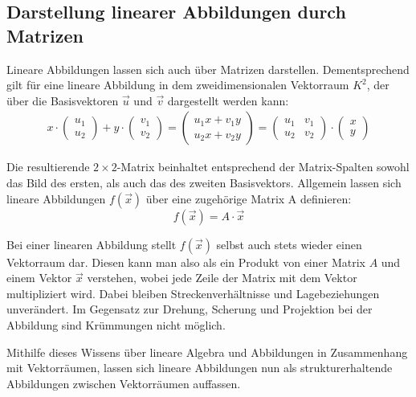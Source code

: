 \documentclass[]{dsadokumentation}
\begin{document}
\subsection{Darstellung linearer Abbildungen durch Matrizen}
Lineare Abbildungen lassen sich auch über Matrizen darstellen. Dementsprechend gilt für eine lineare Abbildung in dem zweidimensionalen Vektorraum $K^2$, der über die Basisvektoren $\vec{u}$ und $\vec{v}$ dargestellt werden kann:
\begin{equation}
  \begin{aligned}
    x \cdot \left(\begin{array}{c} u_1 \\ u_2 \end{array}\right) + y \cdot \left(\begin{array}{c} v_1 \\ v_2 \end{array}\right) = \left(\begin{array}{c} u_1 x + v_1 y \\ u_2 x + v_2 y \end{array}\right) = \left( \begin{array}{rr} u_1 & v_1 \\ u_2 & v_2 \end{array}\right) \cdot \left(\begin{array}{c} x \\ y \end{array}\right)
  \end{aligned}
\end{equation}

Die resultierende $2 \times 2$-Matrix beinhaltet entsprechend der Matrix-Spalten sowohl das Bild des ersten, als auch das des zweiten Basisvektors. Allgemein lassen sich lineare Abbildungen $f(\vec{x})$ über eine zugehörige Matrix A definieren:
\begin{equation}
  f(\vec{x}) = A \cdot \vec{x}
\end{equation}

Bei einer linearen Abbildung stellt $f(\vec{x})$ selbst auch stets wieder einen Vektorraum dar. Diesen kann man also als ein Produkt von einer Matrix $A$ und einem Vektor $\vec{x}$ verstehen, wobei jede Zeile der Matrix mit dem Vektor multipliziert wird. Dabei bleiben Streckenverhältnisse und Lagebeziehungen unverändert. Im Gegensatz zur Drehung, Scherung und Projektion bei der Abbildung sind Krümmungen nicht möglich.

Mithilfe dieses Wissens über lineare Algebra und Abbildungen in Zusammenhang mit Vektorräumen, lassen sich lineare Abbildungen nun als strukturerhaltende Abbildungen zwischen Vektorräumen auffassen.
\end{document}
